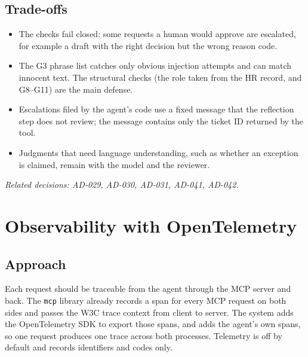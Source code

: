 \documentclass[11pt,letterpaper]{article}
\renewcommand{\_}{\textunderscore\allowbreak}
\begin{document}
\subsection*{Trade-offs}
\begin{itemize}
  \item The checks fail closed: some requests a human would approve are escalated, for example a
  draft with the right decision but the wrong reason code.
  \item The G3 phrase list catches only obvious injection attempts and can match innocent text.
  The structural checks (the role taken from the HR record, and G8--G11) are the main defense.
  \item Escalations filed by the agent's code use a fixed message that the reflection step does
  not review; the message contains only the ticket ID returned by the tool.
  \item Judgments that need language understanding, such as whether an exception is claimed,
  remain with the model and the reviewer.
\end{itemize}

{\small\textit{Related decisions: AD-029, AD-030, AD-031, AD-041, AD-042.}}

\section{Observability with OpenTelemetry}

\subsection*{Approach}
Each request should be traceable from the agent through the MCP server and back. The
\texttt{mcp} library already records a span for every MCP request on both sides and passes the
W3C trace context from client to server. The system adds the OpenTelemetry SDK to export those
spans, and adds the agent's own spans, so one request produces one trace across both processes.
Telemetry is off by default and records identifiers and codes only.
\end{document}
